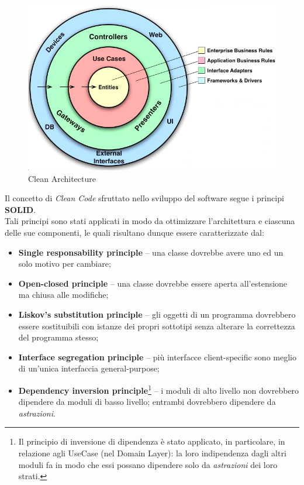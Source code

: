 \documentclass{natourDoc}
\begin{document}
\begin{figure}[!htbp]
	\centering
	\includegraphics[width=\textwidth]{./diagrams/cleanarchitecture.png}
	\caption{Clean Architecture}
\end{figure}

Il concetto di \textit{Clean Code} sfruttato nello sviluppo del software segue i principi \textbf{SOLID}. \\
Tali principi sono stati applicati in modo da ottimizzare l’architettura e ciascuna delle sue componenti, le quali risultano dunque essere caratterizzate dal:
\begin{itemize}
	\item \textbf{Single responsability principle} – una classe dovrebbe avere uno ed un solo motivo per cambiare;
	\item \textbf{Open-closed principle} – una classe dovrebbe essere aperta all’estensione ma chiusa alle modifiche;
	\item \textbf{Liskov’s substitution principle} – gli oggetti di un programma dovrebbero essere sostituibili con istanze dei propri sottotipi senza alterare la correttezza del programma stesso;
	\item \textbf{Interface segregation principle} – più interfacce client-specific sono meglio di un’unica interfaccia general-purpose;
	\item \textbf{Dependency inversion principle}\footnote{
		      Il principio di inversione di dipendenza è stato applicato, in particolare, in relazione agli UseCase (nel Domain Layer): la loro indipendenza dagli altri moduli fa in modo che essi possano dipendere
		      solo da \textit{astrazioni} dei loro strati.}
	      – i moduli di alto livello non dovrebbero dipendere da moduli di basso livello; entrambi dovrebbero dipendere da \textit{astrazioni}.
\end{itemize}
\end{document}
